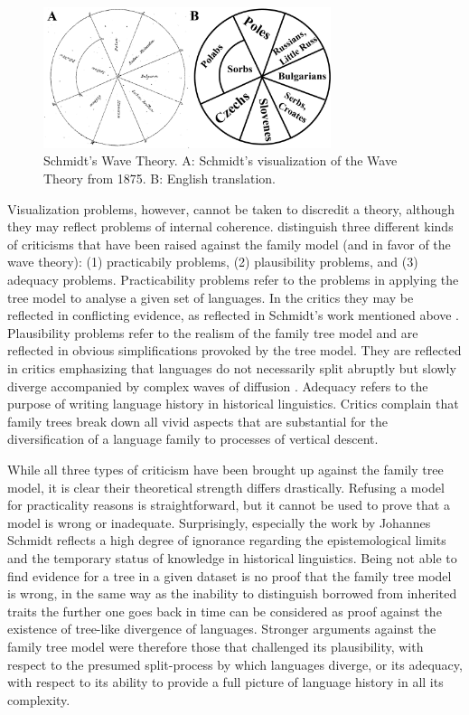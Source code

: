 \documentclass[svgnames,12pt]{scrartcl}
\begin{document}
{\begin{figure}[htb]
\centering
\includegraphics[width=0.75\textwidth]{images/schmidt-1875.pdf}
\caption{Schmidt's Wave Theory. A: Schmidt's visualization of the Wave Theory from 1875. B: English
translation.}
\label{fig:schmidt1875}
\end{figure}

Visualization problems, however, cannot be taken to discredit a theory, although they may reflect
problems of internal coherence. \citet[118-120]{Geisler2013} distinguish three different kinds of
criticisms that have been raised against the family model (and in favor of the wave theory): (1)
practicabily problems, (2) plausibility problems, and (3) adequacy problems. Practicability
problems refer to the problems in applying the tree model to analyse a given set of languages. In
the critics they may be reflected in conflicting evidence, as reflected in Schmidt's work mentioned
above \citep{Schmidt1872}. Plausibility problems refer to the realism of the family tree model and
are reflected in obvious simplifications provoked by the tree model. They are reflected in critics
emphasizing that languages do not necessarily split abruptly but slowly diverge accompanied by
complex waves of diffusion \citep{Schuchardt1870,Schmidt1872}. Adequacy refers to the purpose of
writing language history in historical linguistics. Critics complain that family trees break down
all vivid aspects that are substantial for the diversification of a language family to processes of
vertical descent. 
 
While all three types of criticism have been brought up against the family tree model, it is clear
their theoretical strength differs drastically. Refusing a model for practicality reasons is
straightforward, but it cannot be used to prove that a model is wrong or inadequate.  Surprisingly,
especially the work by Johannes Schmidt reflects a high degree of ignorance regarding the
epistemological limits and the temporary status of knowledge in historical linguistics. Being not
able to find evidence for a tree in a given dataset is no proof that the family tree model is wrong,
in the same way as the inability to distinguish borrowed from inherited traits the further one goes
back in time can be considered as proof against the existence of tree-like divergence of languages.
Stronger arguments against the family tree model were therefore those that challenged its
plausibility, with respect to the presumed split-process by which languages diverge, or its
adequacy, with respect to its ability to provide a full picture of language history in all its
complexity.
 
}
\end{document}
